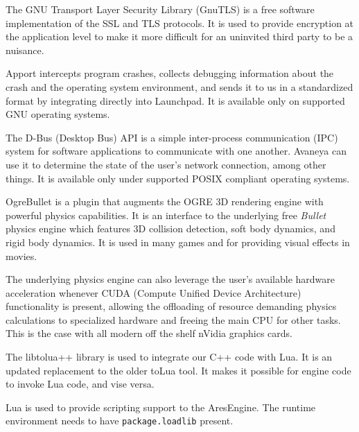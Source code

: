 
The GNU Transport Layer Security Library (GnuTLS) is a free software implementation of the SSL and TLS protocols. It is used to provide encryption at the application level to make it more difficult for an uninvited third party to be a nuisance.
\stopitemize


\startitemize[4]

Apport intercepts program crashes, collects debugging information about the crash and the operating system environment, and sends it to us in a standardized format by integrating directly into Launchpad. It is available only on supported GNU operating systems.


The D-Bus (Desktop Bus) API is a simple inter-process communication (IPC) system for software applications to communicate with one another. Avaneya can use it to determine the state of the user's network connection, among other things. It is available only under supported POSIX compliant operating systems.
\stopitemize


\startitemize[4]

OgreBullet is a plugin that augments the OGRE 3D rendering engine with powerful physics capabilities. It is an interface to the underlying free {\it Bullet} physics engine which features 3D collision detection, soft body dynamics, and rigid body dynamics. It is used in many games and for providing visual effects in movies. 

The underlying physics engine can also leverage the user's available hardware acceleration whenever CUDA (Compute Unified Device Architecture) functionality is present, allowing the offloading of resource demanding physics calculations to specialized hardware and freeing the main CPU for other tasks. This is the case with all modern off the shelf nVidia graphics cards.
\stopitemize



\startitemize[4]

The libtolua++ library is used to integrate our C++ code with Lua. It is an updated replacement to the older toLua tool. It makes it possible for engine code to invoke Lua code, and vise versa.


Lua is used to provide scripting support to the AresEngine. The runtime environment needs to have {\tt package.loadlib} present.
\stopitemize

\StopChapter

